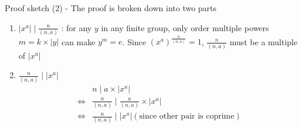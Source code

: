 \documentclass[titlepage, 12pt]{book}
\begin{document}
Proof sketch (2) - The proof is broken down into two parts
\begin{enumerate}
    \item $|x^a|\mid\frac{n}{(n, a)}$ : for any $y$ in any finite group, only
        order multiple powers $m = k\times |y|$ can make $y^m = e$. Since
        $(x^a)^{\frac{n}{(n, a)}} = 1$,
        $\frac{n}{(n, a)}$ must be a multiple of $|x^a|$ 
    \item $\frac{n}{(n, a)}\mid|x^a|$
        \begin{align*}
                 & n\mid a\times |x^a|\\
            \iff & \frac{n}{(n, a)}\mid \frac{a}{(n, a)}\times|x^a|\\
            \iff & \frac{n}{(n, a)}\mid|x^a| (\textrm{since other pair is coprime})
        \end{align*}
\end{enumerate}
\end{document}
